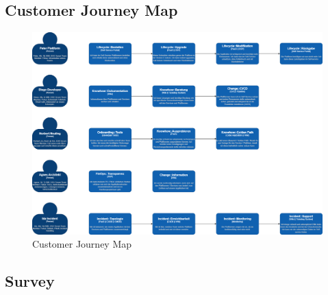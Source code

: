 \documentclass[a4paper,12pt]{article}
\begin{document}
    \subsection{Customer Journey Map}
    \label{subsec:cusjourmap}
    \begin{landscape}
        \begin{figure}[h]
            \includegraphics[origin=c,width=0.9\linewidth]{customer-journey.png}
            \caption{Customer Journey Map}
            \label{fig:customerjourney}
        \end{figure}
    \end{landscape}

    \subsection{Survey}
    \label{subsec:survey}
\end{document}
